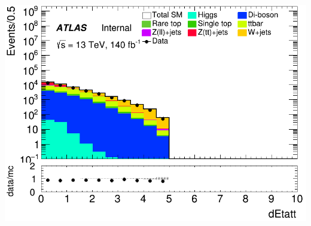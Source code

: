 \documentclass[usenames,dvipsnames]{beamer}
\begin{document}
\begin{frame}
\begin{minipage}{0.32\textwidth}
        \centering
        \includegraphics[width=\textwidth]{graphics/L_met/L_met_dEtatt.png}
    \end{minipage}
    
    \vspace{0.5cm} %
\end{frame}
\end{document}
